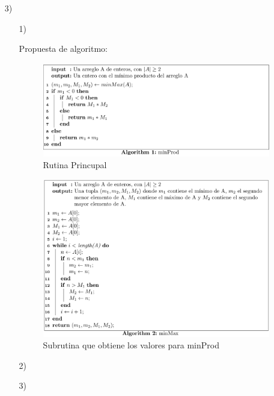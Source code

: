 \documentclass[a4paper, 12pt]{report}
\begin{document}
\begin{enumerate}
{\begin{enumerate}
\end{enumerate}
}
\item[3)]{
\begin{enumerate}
    \item[1)]{
        Propuesta de algoritmo:\\
        \begin{figure}[h!]
            \caption{Rutina Princupal}
            \centering
            \includegraphics[width=\textwidth]{images/minProd.png}
        \end{figure}
        \begin{figure}[h!]
            \caption{Subrutina que obtiene los valores para minProd}
            \centering
            \includegraphics[width=\textwidth]{images/minMax.png}
        \end{figure}


    }
    \item[2)]{}
    \item[3)]{}
\end{enumerate}
}
\end{enumerate}
\end{document}
